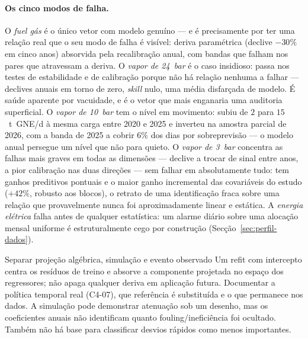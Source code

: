 \paragraph{Os cinco modos de falha.} O \emph{fuel gás} é o único vetor com
modelo genuíno --- e é precisamente por ter uma relação real que o seu
modo de falha é visível: deriva paramétrica (declive $-30\%$ em cinco anos)
absorvida pela recalibração anual, com bandas que falham nos pares que
atravessam a deriva. O \emph{vapor de 24~bar} é o caso insidioso: passa nos
testes de estabilidade e de calibração porque não há relação nenhuma a
falhar --- declives anuais em torno de zero, \emph{skill} nulo, uma média
disfarçada de modelo. É saúde aparente por vacuidade, e é o vetor que mais
enganaria uma auditoria superficial. O \emph{vapor de 10~bar} tem o nível em
movimento: subiu de $2$ para $15$~t~GNE/d à mesma carga entre 2020 e 2025 e
inverteu na amostra parcial de 2026, com a banda de 2025 a cobrir $6\%$ dos
dias por sobreprevisão --- o modelo anual persegue um nível que não para
quieto. O
\emph{vapor de 3~bar} concentra as falhas mais graves em todas as dimensões
--- declive a trocar de sinal entre anos, a pior calibração nas duas direções
--- sem falhar em absolutamente tudo: tem ganhos preditivos pontuais e o maior
ganho incremental das covariáveis do estudo ($+42\%$, robusto aos blocos), o retrato de uma
identificação fraca sobre uma relação que provavelmente nunca foi
aproximadamente linear e estática. A
\emph{energia elétrica} falha antes de qualquer estatística: um alarme
diário sobre uma alocação mensal uniforme é estruturalmente cego por
construção (Secção~\ref{sec:perfil-dados}).

{Separar projeção algébrica, simulação e evento observado}
{Um refit com intercepto centra os resíduos de treino e absorve a
componente projetada no espaço dos regressores; não apaga qualquer
deriva em aplicação futura. Documentar a política temporal real
(C4-07), que referência é substituída e o que permanece nos dados.
A simulação pode demonstrar atenuação sob um desenho, mas os coeficientes
anuais não identificam quanto fouling/ineficiência foi ocultado.
Também não há base para classificar desvios rápidos como menos importantes.}%
